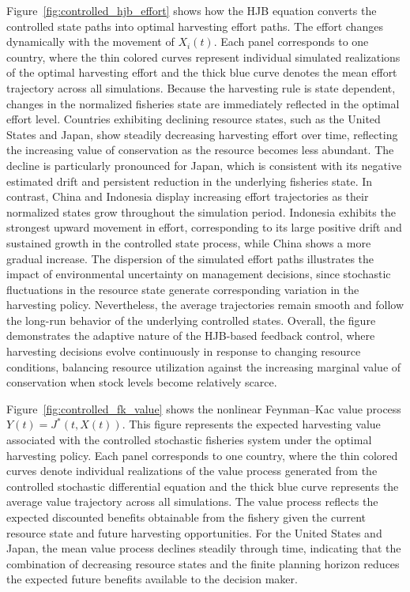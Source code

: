 \documentclass[11pt]{article}
\begin{document}
	Figure~\ref{fig:controlled_hjb_effort} shows how the HJB equation converts the controlled state paths into optimal harvesting effort paths. The effort changes dynamically with the movement of \(X_i(t)\). Each panel corresponds to one country, where the thin colored curves represent individual simulated realizations of the optimal harvesting effort and the thick blue curve denotes the mean effort trajectory across all simulations. Because the harvesting rule is state dependent, changes in the normalized fisheries state are immediately reflected in the optimal effort level. Countries exhibiting declining resource states, such as the United States and Japan, show steadily decreasing harvesting effort over time, reflecting the increasing value of conservation as the resource becomes less abundant. The decline is particularly pronounced for Japan, which is consistent with its negative estimated drift and persistent reduction in the underlying fisheries state. In contrast, China and Indonesia display increasing effort trajectories as their normalized states grow throughout the simulation period. Indonesia exhibits the strongest upward movement in effort, corresponding to its large positive drift and sustained growth in the controlled state process, while China shows a more gradual increase. The dispersion of the simulated effort paths illustrates the impact of environmental uncertainty on management decisions, since stochastic fluctuations in the resource state generate corresponding variation in the harvesting policy. Nevertheless, the average trajectories remain smooth and follow the long-run behavior of the underlying controlled states. Overall, the figure demonstrates the adaptive nature of the HJB-based feedback control, where harvesting decisions evolve continuously in response to changing resource conditions, balancing resource utilization against the increasing marginal value of conservation when stock levels become relatively scarce.
	
	Figure~\ref{fig:controlled_fk_value} shows the nonlinear Feynman--Kac value process \(Y(t)=J^*(t,X(t))\). This figure represents the expected harvesting value associated with the controlled stochastic fisheries system under the optimal harvesting policy. Each panel corresponds to one country, where the thin colored curves denote individual realizations of the value process generated from the controlled stochastic differential equation and the thick blue curve represents the average value trajectory across all simulations. The value process reflects the expected discounted benefits obtainable from the fishery given the current resource state and future harvesting opportunities. For the United States and Japan, the mean value process declines steadily through time, indicating that the combination of decreasing resource states and the finite planning horizon reduces the expected future benefits available to the decision maker. 
	
\end{document}
